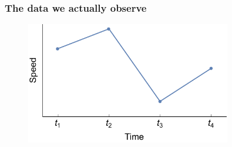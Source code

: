 \documentclass[main.tex]{subfiles}
\begin{document}
\begin{frame}
\frametitle{The data we actually observe}

\begin{figure}
    \centering
    \includegraphics[width=0.8\textwidth]{figures/hmm_time_series.pdf}
\end{figure}
    
\end{frame}
\end{document}
